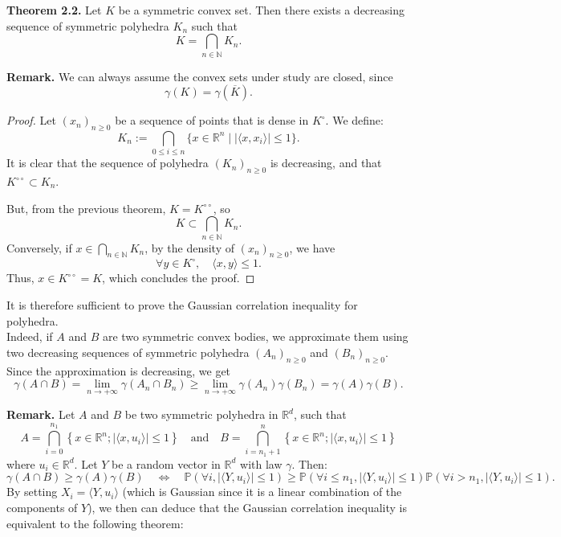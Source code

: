 \documentclass[12pt]{article}
\begin{document}
\textbf{Theorem 2.2.} Let $K$ be a symmetric convex set. Then there exists a decreasing sequence of symmetric polyhedra $K_n$ such that
\[
K = \bigcap_{n \in \mathbb{N}} K_n.
\]

\textbf{Remark.} We can always assume the convex sets under study are closed, since
\[
\gamma(K) = \gamma(\overline{K}).
\]

\begin{proof}
Let $(x_n)_{n \geq 0}$ be a sequence of points that is dense in $K^\circ$. We define:
\[
K_n := \bigcap_{0 \leq i \leq n} \{ x \in \mathbb{R}^n \mid |\langle x, x_i \rangle| \leq 1 \}.
\]
It is clear that the sequence of polyhedra $(K_n)_{n \geq 0}$ is decreasing, and that $K^{\circ\circ} \subset K_n$.

But, from the previous theorem, $K = K^{\circ\circ}$, so
\[
K \subset \bigcap_{n \in \mathbb{N}} K_n.
\]
Conversely, if $x \in \bigcap_{n \in \mathbb{N}} K_n$, by the density of $(x_n)_{n \geq 0}$, we have
\[
\forall y \in K^\circ, \quad \langle x, y \rangle \leq 1.
\]
Thus, $x \in K^{\circ\circ} = K$, which concludes the proof.
\end{proof}

\vspace{0.3cm}

It is therefore sufficient to prove the Gaussian correlation inequality for polyhedra.\\
Indeed, if $A$ and
$B$ are two symmetric convex bodies, we approximate them using two decreasing sequences of symmetric polyhedra $(A_n)_{n \geq 0}$ and $(B_n)_{n \geq 0}$.
Since the approximation is decreasing, we get
\[
\gamma(A \cap B) = \lim_{n \to +\infty} \gamma(A_n \cap B_n)
\geq \lim_{n \to +\infty} \gamma(A_n) \gamma(B_n) = \gamma(A) \gamma(B).
\]

\vspace{0.3cm}

\textbf{Remark.} Let $A$ and $B$ be two symmetric polyhedra in $\mathbb{R}^d$, such that
\[
A = \bigcap_{i=0}^{n_1} \left\{ x \in \mathbb{R}^n ; | \langle x, u_i \rangle | \leq 1 \right\} \quad \text{and} \quad B = \bigcap_{i=n_1+1}^{n} \left\{ x \in \mathbb{R}^n ; | \langle x, u_i \rangle | \leq 1 \right\}
\]
where $u_i \in \mathbb{R}^d$. Let $Y$ be a random vector in $\mathbb{R}^d$ with law $\gamma$. Then:
\[
\gamma(A \cap B) \geq \gamma(A) \gamma(B) \quad \Leftrightarrow \quad \mathbb{P} \left( \forall i, | \langle Y, u_i \rangle | \leq 1 \right) \geq \mathbb{P} \left( \forall i \leq n_1, | \langle Y, u_i \rangle | \leq 1 \right) \mathbb{P} \left( \forall i > n_1, | \langle Y, u_i \rangle | \leq 1 \right).
\]
By setting $X_i = \langle Y, u_i \rangle$ (which is Gaussian since it is a linear combination of the components of $Y$), we then can deduce that the Gaussian correlation inequality is equivalent to the following theorem:
\end{document}
